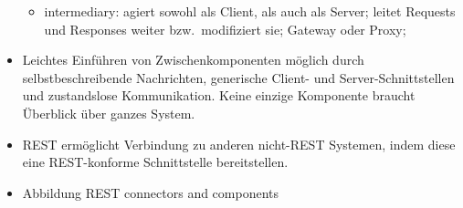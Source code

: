 \begin{itemize}
\begin{itemize}
    \item intermediary: agiert sowohl als Client, als auch als Server; leitet Requests und Responses weiter bzw.\ modifiziert sie; Gateway oder Proxy;
  \end{itemize}
  \item Leichtes Einführen von Zwischenkomponenten möglich durch selbstbeschreibende Nachrichten, generische Client- und Server-Schnittstellen und zustandslose Kommunikation. Keine einzige Komponente braucht Überblick über ganzes System.
  \item REST ermöglicht Verbindung zu anderen nicht-REST Systemen, indem diese eine REST-konforme Schnittstelle bereitstellen.
  \item Abbildung REST connectors and components
\end{itemize}

